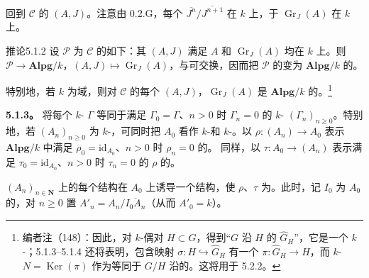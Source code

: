回到 $\mathcal C$ 的 $(A,J)$。注意由 0.2.G，每个 $\overline{J^n}/\overline{J^{n+1}}$ 在 $k$ 上，于 $\operatorname{Gr}_J(A)$ 在 $k$ 上。
\begin{SGAresult}{推论}{5.1.2}
设 $\mathcal P$ 为 $\mathcal C$ 的如下：其 $(A,J)$ 满足 $A$ 和 $\operatorname{Gr}_J(A)$ 均在 $k$ 上。则 $\mathcal P\to\mathbf{Alpg}/k$，$(A,J)\mapsto\operatorname{Gr}_J(A)$，与可交换，因而把 $\mathcal P$ 的变为 $\mathbf{Alpg}/k$ 的。

特别地，若 $k$ 为域，则对 $\mathcal C$ 的每个 $(A,J)$，$\operatorname{Gr}_J(A)$ 是 $\mathbf{Alpg}/k$ 的。\footnote{编者注（148）：因此，对 $k$-偶对 $H\subset G$，得到“$G$ 沿 $H$ 的 $\widehat G_H$”，它是一个 $k$-；5.1.3--5.1.4 还将表明，包含映射 $\sigma:H\hookrightarrow\widehat G_H$ 有一个 $\pi:\widehat G_H\to H$，而 $k$- $N=\operatorname{Ker}(\pi)$ 作为等同于 $G/H$ 沿的。这将用于 5.2.2。}
\end{SGAresult}

\textbf{5.1.3。} 将每个 $k$- $\Gamma$ 等同于满足 $\Gamma_0=\Gamma$、$n>0$ 时 $\Gamma_n=0$ 的 $k$- $(\Gamma_n)_{n\geq0}$。特别地，若 $(A_n)_{n\geq0}$ 为 $k$-，可同时把 $A_0$ 看作 $k$-和 $k$-。以 $\rho:(A_n)\to A_0$ 表示 $\mathbf{Alpg}/k$ 中满足 $\rho_0=\mathrm{id}_{A_0}$、$n>0$ 时 $\rho_n=0$ 的。
同样，以 $\tau:A_0\to(A_n)$ 表示满足 $\tau_0=\mathrm{id}_{A_0}$、$n>0$ 时 $\tau_n=0$ 的 $\rho$ 的。

$(A_n)_{n\in\mathbf N}$ 上的每个结构在 $A_0$ 上诱导一个结构，使 $\rho$、$\tau$ 为。此时，记 $I_0$ 为 $A_0$ 的，对 $n\geq0$ 置 $A'_n=A_n/\overline{I_0A_n}$（从而 $A'_0=k$）。

